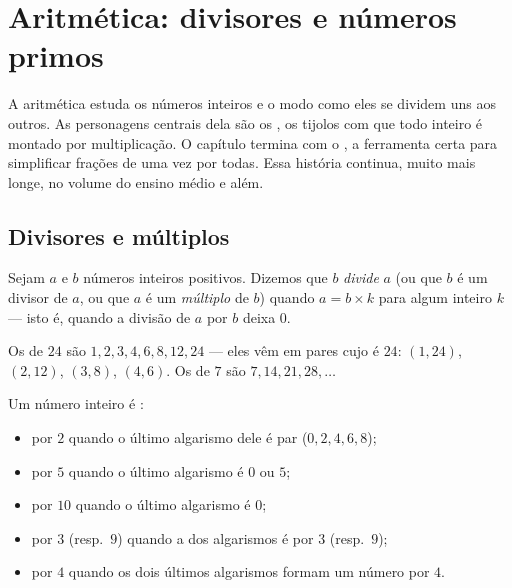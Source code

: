 \chapter{Aritmética: divisores e números primos}\label{ch:g9:arith}

A aritmética estuda os números inteiros e o modo como eles se dividem
uns aos outros. As personagens centrais dela são os , os
tijolos com que todo inteiro é montado por multiplicação. O capítulo
termina com o , a ferramenta certa para simplificar
frações de uma vez por todas. Essa história continua, muito mais longe,
no volume do ensino médio e além.

\section{Divisores e múltiplos}

\begin{definition}\label{def:g9:arith:divisor}
Sejam $a$ e $b$ números inteiros positivos. Dizemos que $b$
\emph{divide} $a$ (ou que $b$ é um divisor de $a$, ou
que $a$ é um \emph{múltiplo} de $b$) quando
$a = b \times k$ para algum inteiro $k$ --- isto é, quando a divisão de
$a$ por $b$ deixa  $0$.
\end{definition}

\begin{example}
Os  de $24$ são $1, 2, 3, 4, 6, 8, 12, 24$ --- eles vêm em
pares cujo  é $24$: $(1,24)$, $(2,12)$, $(3,8)$, $(4,6)$. Os
 de $7$ são $7, 14, 21, 28, \dots$
\end{example}

\begin{proposition}\label{prop:g9:arith:rules}
Um número inteiro é :
\begin{itemize}
  \item por $2$ quando o último algarismo dele é par ($0, 2, 4, 6, 8$);
  \item por $5$ quando o último algarismo é $0$ ou $5$;
  \item por $10$ quando o último algarismo é $0$;
  \item por $3$ (resp.\ $9$) quando a  dos algarismos é 
        por $3$ (resp.\ $9$);
  \item por $4$ quando os dois últimos algarismos formam um número
         por $4$.
\end{itemize}
\end{proposition}
\admitted

